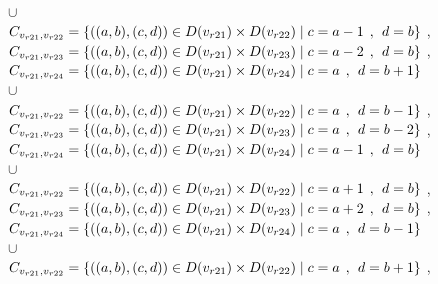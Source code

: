 \\$\cup$
\\$C_{v_{r21},v_{r22}}=\{((a,b),(c,d))\in D(v_{r21}) \times D(v_{r22})\mid c = a - 1\hspace{1ex} , \hspace{1ex}  d = b    \}$ , 
\\$C_{v_{r21},v_{r23}}=\{((a,b),(c,d))\in D(v_{r21}) \times D(v_{r23})\mid c = a - 2\hspace{1ex} , \hspace{1ex}  d = b    \}$ , 
\\$C_{v_{r21},v_{r24}}=\{((a,b),(c,d))\in D(v_{r21}) \times D(v_{r24})\mid c = a  \hspace{1ex} , \hspace{1ex}  d = b + 1 \}$  
\\$\cup$
\\$C_{v_{r21},v_{r22}}=\{((a,b),(c,d))\in D(v_{r21}) \times D(v_{r22})\mid c = a  \hspace{1ex} , \hspace{1ex}  d = b - 1 \}$ , 
\\$C_{v_{r21},v_{r23}}=\{((a,b),(c,d))\in D(v_{r21}) \times D(v_{r23})\mid c = a  \hspace{1ex} , \hspace{1ex}  d = b - 2 \}$ , 
\\$C_{v_{r21},v_{r24}}=\{((a,b),(c,d))\in D(v_{r21}) \times D(v_{r24})\mid c = a - 1\hspace{1ex} , \hspace{1ex}  d = b   \}$  
\\$\cup$
\\$C_{v_{r21},v_{r22}}=\{((a,b),(c,d))\in D(v_{r21}) \times D(v_{r22})\mid c = a + 1\hspace{1ex} , \hspace{1ex}  d = b   \}$ , 
\\$C_{v_{r21},v_{r23}}=\{((a,b),(c,d))\in D(v_{r21}) \times D(v_{r23})\mid c = a + 2\hspace{1ex} , \hspace{1ex}  d = b   \}$ , 
\\$C_{v_{r21},v_{r24}}=\{((a,b),(c,d))\in D(v_{r21}) \times D(v_{r24})\mid c = a   \hspace{1ex} , \hspace{1ex}  d = b - 1 \}$  
\\$\cup$
\\$C_{v_{r21},v_{r22}}=\{((a,b),(c,d))\in D(v_{r21}) \times D(v_{r22})\mid c = a   \hspace{1ex} , \hspace{1ex}  d = b + 1 \}$ , 
